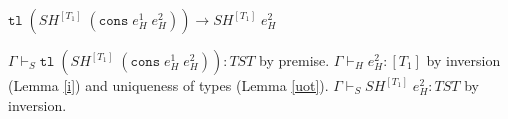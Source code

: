 \begin{case}
$\mathtt{tl}\;(SH^{[T_{1}]}\;(\mathtt{cons}\;e_{H}^{1}\;e_{H}^{2}))\rightarrow SH^{[T_{1}]}\;e_{H}^{2}$

$\Gamma\vdash_{S}\mathtt{tl}\;(SH^{[T_{1}]}\;(\mathtt{cons}\;e_{H}^{1}\;e_{H}^{2})):TST$ by premise.  $\Gamma\vdash_{H}e_{H}^{2}:[T_{1}]$ by inversion (Lemma \ref{i}) and uniqueness of types (Lemma \ref{uot}).  $\Gamma\vdash_{S}SH^{[T_{1}]}\;e_{H}^{2}:TST$ by inversion.
\end{case}